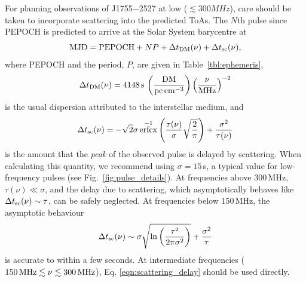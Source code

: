 \documentclass[fleqn,usenatbib]{mnras}
\newcommand{\src}{J1755$-$2527}
\DeclareMathOperator{\erfcx}{erfcx}
\newcommand{\Fig}{Fig.}
\newcommand{\Tab}{Table}
\begin{document}
For planning observations of \src{} at low ($\lesssim 300 MHz$), care should be taken to incorporate scattering into the predicted ToAs.
The $N$th pulse since PEPOCH is predicted to arrive at the Solar System barycentre at
\begin{equation}
    {\rm MJD} = {\rm PEPOCH} + NP + \Delta t_{\rm DM}(\nu) + \Delta t_{\rm sc}(\nu),
\end{equation}
where PEPOCH and the period, $P$, are given in \Tab~\ref{tbl:ephemeris},
\begin{equation}
    \Delta t_{\rm DM}(\nu) = 4148\,{\rm s} \, \left(\frac{\rm DM}{{\rm pc\,cm}^{-3}}\right) \left(\frac{\nu}{\rm MHz}\right)^{-2}
\end{equation}
is the usual dispersion attributed to the interstellar medium, and
\begin{equation}
    \Delta t_{\rm sc}(\nu) = -\sqrt{2}\sigma\erfcx^{-1}\left(\frac{\tau(\nu)}{\sigma}\sqrt{\frac{2}{\pi}}\right) + \frac{\sigma^2}{\tau(\nu)}
    \label{eqn:scattering_delay}
\end{equation}
is the amount that the \emph{peak} of the observed pulse is delayed by scattering.
When calculating this quantity, we recommend using $\sigma = 15\,$s, a typical value for low-frequency pulses (see \Fig~\ref{fig:pulse_details}).
At frequencies above $300\,$MHz, $\tau(\nu) \ll \sigma$, and the delay due to scattering, which asymptotically behaves like $\Delta t_{\rm sc}(\nu) \sim \tau$, can be safely neglected.
At frequencies below $150\,$MHz, the asymptotic behaviour
\begin{equation}
    \Delta t_{\rm sc}(\nu) \sim \sigma \sqrt{\ln \left(\frac{\tau^2}{2\pi \sigma^2}\right)} + \frac{\sigma^2}{\tau}
\end{equation}
is accurate to within a few seconds.
At intermediate frequencies ($150\,{\rm MHz} \lesssim \nu \lesssim 300\,{\rm MHz}$), Eq. \eqref{eqn:scattering_delay} should be used directly.

\end{document}
